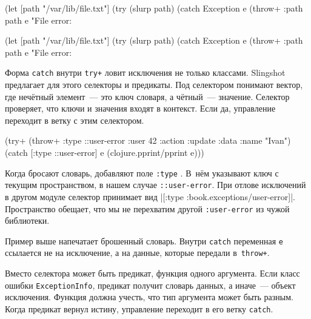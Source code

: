 \begin{english}
  \begin{clojure}
(let [path "/var/lib/file.txt"]
  (try
    (slurp path)
    (catch Exception e
      (throw+ {:path path} e
      "File error: %
  \end{clojure}
\end{english}

\else

\begin{english}
  \begin{clojure}
(let [path "/var/lib/file.txt"]
  (try
    (slurp path)
    (catch Exception e
      (throw+ {:path path} e "File error: %
  \end{clojure}
\end{english}

\fi


Форма \verb|catch| внутри \verb|try+| ловит исключения не только
классами. Slingshot предлагает для этого селекторы и предикаты. Под селектором
понимают вектор, где нечётный элемент~--- это ключ словаря, а чётный~---
значение. Селектор проверяет, что ключи и значения входят в контекст. Если да,
управление переходит в ветку с этим селектором.

\begin{english}
  \begin{clojure/lines}
(try+
 (throw+ {:type ::user-error
          :user 42
          :action :update
          :data {:name "Ivan"}})
 (catch [:type ::user-error] e
   (clojure.pprint/pprint e)))
  \end{clojure/lines}
\end{english}

Когда бросают словарь, добавляют поле \verb|:type| . В~нём указывают
ключ с текущим пространством, в нашем случае \verb|::user-error|. При отлове
исключений в другом модуле селектор принимает вид
\spverb|[:type :book.exceptions/user-error]|. Пространство обещает, что мы не
перехватим другой \texttt{:user\--error} из чужой библиотеки.

Пример выше напечатает брошенный словарь. Внутри \verb|catch| переменная
\verb|e| ссылается не на исключение, а на данные, которые передали
в~\verb|throw+|.

Вместо селектора может быть предикат, функция одного аргумента. Если класс
ошибки \verb|ExceptionInfo|, предикат получит словарь данных, а иначе~--- объект
исключения. Функция должна учесть, что тип аргумента может быть разным. Когда
предикат вернул истину, управление переходит в его ветку \verb|catch|.

